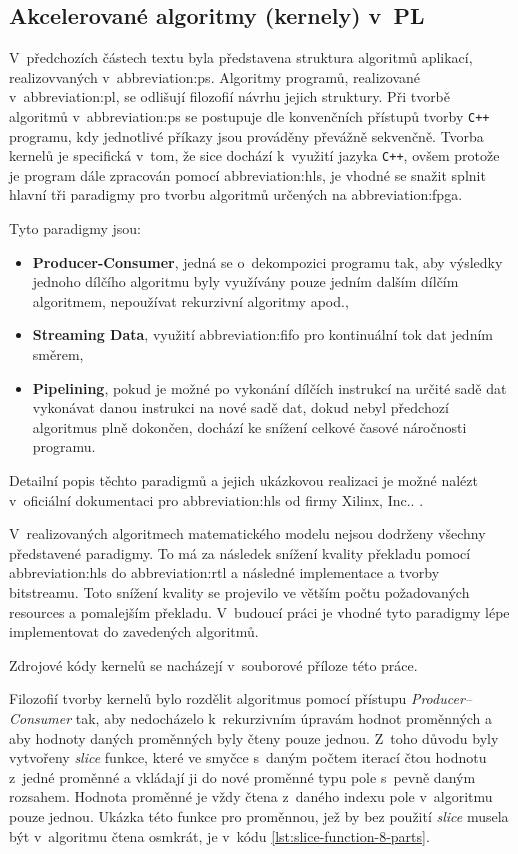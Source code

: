 \documentclass[a4paper, twoside, 11pt]{article}
\begin{document}
	\subsection{Akcelerované algoritmy (kernely) v~PL}\label{subsec:akcelerovane-algoritmy-kernely-v-pl}
		V~předchozích částech textu byla představena struktura algoritmů aplikací, realizovvaných v~\gls{abbreviation:ps}. Algoritmy programů, realizované v~\gls{abbreviation:pl}, se odlišují filozofií návrhu jejich struktury. Při tvorbě algoritmů v~\gls{abbreviation:ps} se postupuje dle konvenčních přístupů tvorby \texttt{C++} programu, kdy jednotlivé příkazy jsou prováděny převážně sekvenčně. Tvorba kernelů je specifická v~tom, že sice dochází k~využití jazyka \texttt{C++}, ovšem protože je program dále zpracován pomocí \gls{abbreviation:hls}, je vhodné se snažit splnit hlavní tři paradigmy pro tvorbu algoritmů určených na \gls{abbreviation:fpga}.\par
		Tyto paradigmy jsou:
		\begin{itemize}
			\item \textbf{Producer-Consumer}, jedná se o~dekompozici programu tak, aby výsledky jednoho dílčího algoritmu byly využívány pouze jedním dalším dílčím algoritmem, nepoužívat rekurzivní algoritmy apod.,
			\item \textbf{Streaming Data}, využití \gls{abbreviation:fifo} pro kontinuální tok dat jedním směrem,
			\item \textbf{Pipelining}, pokud je možné po vykonání dílčích instrukcí na určité sadě dat vykonávat danou instrukci na nové sadě dat, dokud nebyl předchozí algoritmus plně dokončen, dochází ke snížení celkové časové náročnosti programu. 
		\end{itemize}
		Detailní popis těchto paradigmů a jejich ukázkovou realizaci je možné nalézt v~oficiální dokumentaci pro \gls{abbreviation:hls} od firmy Xilinx, Inc.. \cite{vitis-high-level-synthesis-user-guide}.\par
		V~realizovaných algoritmech matematického modelu nejsou dodrženy všechny představené paradigmy. To má za následek snížení kvality překladu pomocí \gls{abbreviation:hls} do \gls{abbreviation:rtl} a následné implementace a tvorby bitstreamu. Toto snížení kvality se projevilo ve větším počtu požadovaných resources a pomalejším překladu. V~budoucí práci je vhodné tyto paradigmy lépe implementovat do zavedených algoritmů.\par
		Zdrojové kódy kernelů se nacházejí v~souborové příloze této práce.\par
		Filozofií tvorby kernelů bylo rozdělit algoritmus pomocí přístupu \textit{Producer–Consumer} tak, aby nedocházelo k~rekurzivním úpravám hodnot proměnných a aby hodnoty daných proměnných byly čteny pouze jednou. Z~toho důvodu byly vytvořeny \textit{slice} funkce, které ve smyčce s~daným počtem iterací čtou hodnotu z~jedné proměnné a vkládají ji do nové proměnné typu pole s~pevně daným rozsahem. Hodnota proměnné je vždy čtena z~daného indexu pole v~algoritmu pouze jednou. Ukázka této funkce pro proměnnou, jež by bez použití \textit{slice} musela být v~algoritmu čtena osmkrát, je v~kódu \ref{lst:slice-function-8-parts}.\par
\end{document}
